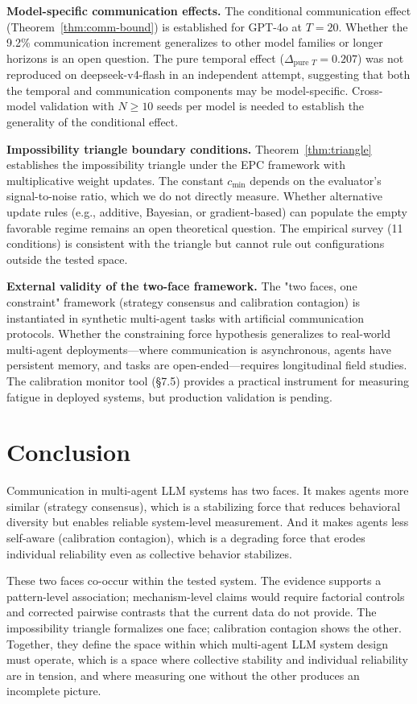\documentclass[11pt]{article}
\begin{document}
\textbf{Model-specific communication effects.} The conditional communication effect (Theorem~\ref{thm:comm-bound}) is established for GPT-4o at $T{=}20$. Whether the 9.2\% communication increment generalizes to other model families or longer horizons is an open question. The pure temporal effect ($\Delta_{\text{pure } T}{=}0.207$) was not reproduced on deepseek-v4-flash in an independent attempt, suggesting that both the temporal and communication components may be model-specific. Cross-model validation with $N{\geq}10$ seeds per model is needed to establish the generality of the conditional effect.

\textbf{Impossibility triangle boundary conditions.} Theorem~\ref{thm:triangle} establishes the impossibility triangle under the EPC framework with multiplicative weight updates. The constant $c_{\min}$ depends on the evaluator's signal-to-noise ratio, which we do not directly measure. Whether alternative update rules (e.g., additive, Bayesian, or gradient-based) can populate the empty favorable regime remains an open theoretical question. The empirical survey (11 conditions) is consistent with the triangle but cannot rule out configurations outside the tested space.

\textbf{External validity of the two-face framework.} The "two faces, one constraint" framework (strategy consensus and calibration contagion) is instantiated in synthetic multi-agent tasks with artificial communication protocols. Whether the constraining force hypothesis generalizes to real-world multi-agent deployments—where communication is asynchronous, agents have persistent memory, and tasks are open-ended—requires longitudinal field studies. The calibration monitor tool (\S7.5) provides a practical instrument for measuring fatigue in deployed systems, but production validation is pending.

\section{Conclusion}

Communication in multi-agent LLM systems has two faces. It makes agents more similar (strategy consensus), which is a stabilizing force that reduces behavioral diversity but enables reliable system-level measurement. And it makes agents less self-aware (calibration contagion), which is a degrading force that erodes individual reliability even as collective behavior stabilizes.

These two faces co-occur within the tested system. The evidence supports a pattern-level association; mechanism-level claims would require factorial controls and corrected pairwise contrasts that the current data do not provide. The impossibility triangle formalizes one face; calibration contagion shows the other. Together, they define the space within which multi-agent LLM system design must operate, which is a space where collective stability and individual reliability are in tension, and where measuring one without the other produces an incomplete picture.
\end{document}
